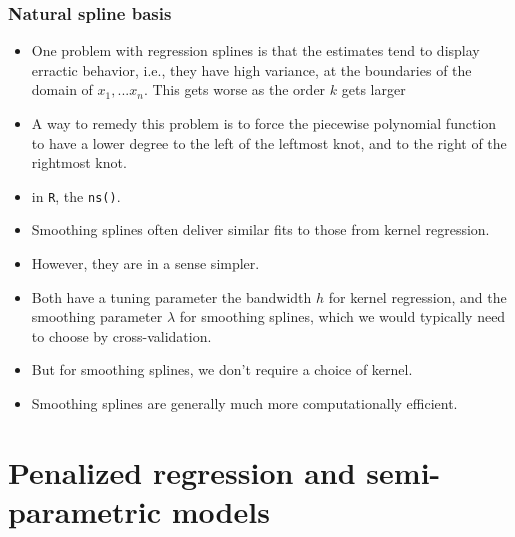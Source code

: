 \documentclass[11pt]{beamer}
\begin{document}
\begin{frame}[fragile]
 \frametitle{Natural spline basis}
 \footnotesize
 \begin{itemize}
\item One problem with regression splines is that the estimates tend to display erractic behavior,
i.e., they have high variance, at the boundaries of the domain of $x_1,...x_n$. This gets worse as the order $k$ gets larger
\item A way to remedy this problem is to force the piecewise polynomial function to have a lower degree to the left of the leftmost knot, and to the right of the rightmost knot.
\item in \texttt{R}, the \texttt{ns()}.
 \end{itemize}
\end{frame}

\begin{frame}
 \footnotesize
 \begin{itemize}
  \item Smoothing splines often deliver similar fits to those from kernel regression.
  \item However, they are in a sense simpler.  
  \item Both have a tuning parameter the bandwidth $h$ for kernel regression, and the smoothing parameter
$\lambda$ for smoothing splines, which we would typically need to choose by cross-validation.  
  \item But for smoothing splines, we don't require a choice of kernel.  
  \item Smoothing splines are generally much more computationally efficient.
 \end{itemize}
\end{frame}



\section{Penalized regression and semi-parametric models}
\end{document}
